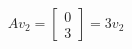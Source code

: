 \documentclass{article}
\begin{document}
\begin{align*}
Av_2 = \begin{bmatrix}0\\3\end{bmatrix} = 3v_2
\end{align*}
\end{document}
